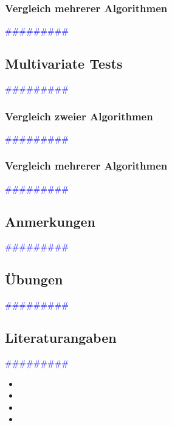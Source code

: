 \documentclass{article}
\begin{document}
    \subsubsection{Vergleich mehrerer Algorithmen} %
       \textcolor{blue}{\#\#\#\#\#\#\#\#\#}
  \subsection{Multivariate Tests} %
       \textcolor{blue}{\#\#\#\#\#\#\#\#\#}
    \subsubsection{Vergleich zweier Algorithmen} %
       \textcolor{blue}{\#\#\#\#\#\#\#\#\#}
    \subsubsection{Vergleich mehrerer Algorithmen} %
       \textcolor{blue}{\#\#\#\#\#\#\#\#\#}
  \subsection{Anmerkungen} %
       \textcolor{blue}{\#\#\#\#\#\#\#\#\#}
  \subsection{Übungen} %
       \textcolor{blue}{\#\#\#\#\#\#\#\#\#}
  \subsection{Literaturangaben} %
       \textcolor{blue}{\#\#\#\#\#\#\#\#\#}
 
      \begin{itemize}
      \color{red}
        \item 
        \item
      \color{ForestGreen}
        \item
        \item
      \end{itemize}


      

\newpage
\end{document}

